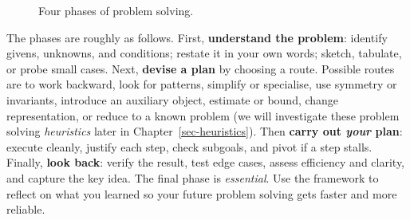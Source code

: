 \documentclass[
  a4paper,
  DIV=11,
  numbers=noendperiod,
  oneside]{scrreprt}
\begin{document}
\begin{figure}


\caption{\label{fig-phases}Four phases of problem solving.}

\end{figure}%

The phases are roughly as follows. First, \textbf{understand the
problem}: identify givens, unknowns, and conditions; restate it in your
own words; sketch, tabulate, or probe small cases. Next, \textbf{devise
a plan} by choosing a route. Possible routes are to work backward, look
for patterns, simplify or specialise, use symmetry or invariants,
introduce an auxiliary object, estimate or bound, change representation,
or reduce to a known problem (we will investigate these problem solving
\emph{heuristics} later in Chapter~\ref{sec-heuristics}). Then
\textbf{carry out \emph{your} plan}: execute cleanly, justify each step,
check subgoals, and pivot if a step stalls. Finally, \textbf{look back}:
verify the result, test edge cases, assess efficiency and clarity, and
capture the key idea. The final phase is \emph{essential}. Use the
framework to reflect on what you learned so your future problem solving
gets faster and more reliable.
\end{document}
